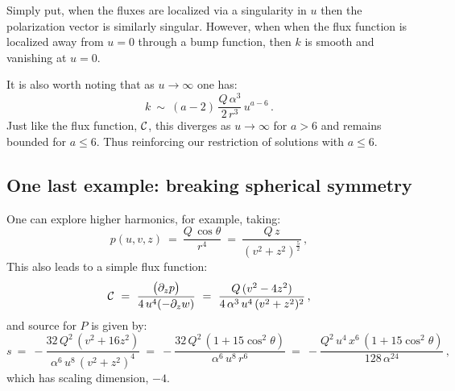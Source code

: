 \documentclass[11pt]{article}
\def\cC{{\cal C}}
\numberwithin{equation}{section}
\begin{document}
Simply put, when the fluxes are localized via a singularity in $u$ then the polarization vector is similarly singular.  However, when when the flux function is localized away from $u=0$ through a bump function, then $k$ is smooth and vanishing at $u=0$.

It is also worth noting that as $u \to \infty$ one has:
%
\begin{equation}
k  ~\sim~ (a-2) \,  \frac{Q\,\alpha^{3}  }{ 2\,r^3} \, u^{a-6}\,.
\label{kinf1}
\end{equation}
%
Just like the flux function, $\cC$, this  diverges as $u \to \infty$ for  $a > 6$ and remains bounded for $a \le 6$. Thus reinforcing our restriction of solutions with $a \le 6$.

\subsection{One last example: breaking spherical symmetry}
\label{ss:example5} 

One can explore higher harmonics, for example, taking:
%
\begin{equation}
 p(u,v, z)  ~=~ \frac{Q\,\cos \theta }{r^4}  ~=~ \frac{Q \, z}{(v^2 +z^2)^{\frac{5}{2} } }\,,
 \label{p-simp3}
\end{equation}
%
This also leads to a simple flux function: 
% 
\begin{equation}
\cC ~=~   \frac{\big( \partial_z p \big) }  {4\, u^4  (-\partial_z w)}   ~=~  \frac{Q\,(v^2-4 z^2)}{4\, \alpha^3 \, u^4 \, (v^2 +z^2)^2} \,,
 \label{C3part2}
\end{equation}
% 
and source for $P$  is given by:
%
\begin{equation}
s  ~=~    -\frac{32\, Q^2\, (v^2 +16 z^2)}{\alpha^6\,u^8 \, (v^2 +z^2)^{4} } ~=~    -\frac{32\, Q^2\, (1 +15 \cos^2 \theta )}{\alpha^6\,u^8 \, r^{6} } ~=~    -\frac{Q^2\,u^4  \, x^6  \, (1 +15 \cos^2 \theta )}{128\,  \alpha^{24} } \,, 
\label{source-simp2}
\end{equation}
%
 which has scaling dimension, $-4$.  
 
\end{document}
